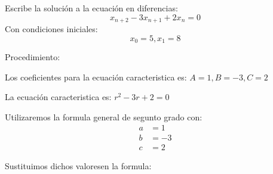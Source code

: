\documentclass{article}
\begin{document}
Escribe la solución a la ecuación en diferencias: $$x_{n+2}-3x_{n+1}+2x_n=0$$
Con condiciones iniciales:
$$x_0=5, x_1=8$$ 

Procedimiento:

Los coeficientes para la  ecuación caracteristica es:
$A=1, B=-3, C=2$ 

La ecuación caracteristica es:
$r^2-3r+2=0$

Utilizaremos la formula general de segunto grado con:
\begin{align*}
  a&=1\\
  b&=-3\\
  c&=2       
\end{align*}

Sustituimos dichos valoresen la formula:
\end{document}
